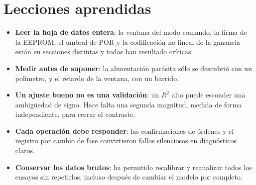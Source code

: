 \section{Lecciones aprendidas}

\begin{itemize}
  \item \textbf{Leer la hoja de datos entera}: la ventana del modo comando, la firma de la EEPROM, el
        umbral de POR y la codificación no lineal de la ganancia están en secciones distintas y todas
        han resultado críticas.
  \item \textbf{Medir antes de suponer}: la alimentación parásita sólo se descubrió con un polímetro,
        y el retardo de la ventana, con un barrido.
  \item \textbf{Un ajuste bueno no es una validación}: un $R^2$ alto puede esconder una ambigüedad de
        signo. Hace falta una segunda magnitud, medida de forma independiente, para cerrar el
        contraste.
  \item \textbf{Cada operación debe responder}: las confirmaciones de órdenes y el registro por
        cambio de fase convirtieron fallos silenciosos en diagnósticos claros.
  \item \textbf{Conservar los datos brutos}: ha permitido recalibrar y reanalizar todos los ensayos
        sin repetirlos, incluso después de cambiar el modelo por completo.
\end{itemize}

